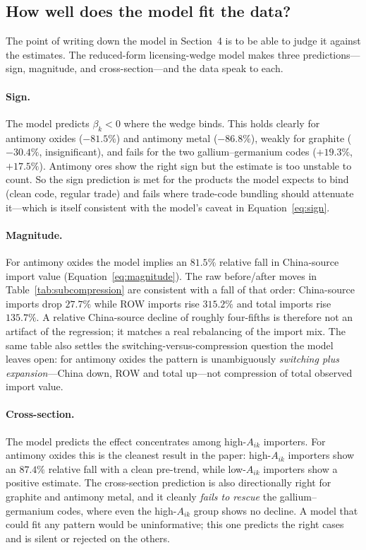 \documentclass[12pt,a4paper]{article}
\begin{document}


\subsection{How well does the model fit the data?}\label{sec:reading}

The point of writing down the model in Section~4 is to be able to judge it
against the estimates. The reduced-form licensing-wedge model makes three
predictions---sign, magnitude, and cross-section---and the data speak to each.

\paragraph{Sign.} The model predicts $\beta_k<0$ where the wedge binds. This
holds clearly for antimony oxides ($-81.5\%$) and antimony metal ($-86.8\%$),
weakly for graphite ($-30.4\%$, insignificant), and fails for the two
gallium--germanium codes ($+19.3\%$, $+17.5\%$). Antimony ores show the right
sign but the estimate is too unstable to count. So the sign prediction is met
for the products the model expects to bind (clean code, regular trade) and fails
where trade-code bundling should attenuate it---which is itself consistent with
the model's caveat in Equation~\eqref{eq:sign}.

\paragraph{Magnitude.} For antimony oxides the model implies an $81.5\%$
relative fall in China-source import value (Equation~\ref{eq:magnitude}). The raw
before/after moves in Table~\ref{tab:subcompression} are consistent with a fall
of that order: China-source imports drop $27.7\%$ while ROW imports rise
$315.2\%$ and total imports rise $135.7\%$. A relative China-source decline of
roughly four-fifths is therefore not an artifact of the regression; it matches a
real rebalancing of the import mix. The same table also settles the
switching-versus-compression question the model leaves open: for antimony oxides
the pattern is unambiguously \emph{switching plus expansion}---China down, ROW
and total up---not compression of total observed import value.

\paragraph{Cross-section.} The model predicts the effect concentrates among
high-$A_{ik}$ importers. For antimony oxides this is the cleanest result in the
paper: high-$A_{ik}$ importers show an $87.4\%$ relative fall with a clean
pre-trend, while low-$A_{ik}$ importers show a positive estimate. The cross-section
prediction is also directionally right for graphite and antimony metal, and it
cleanly \emph{fails to rescue} the gallium--germanium codes, where even the
high-$A_{ik}$ group shows no decline. A model that could fit any pattern would be
uninformative; this one predicts the right cases and is silent or rejected on the
others.
\end{document}
